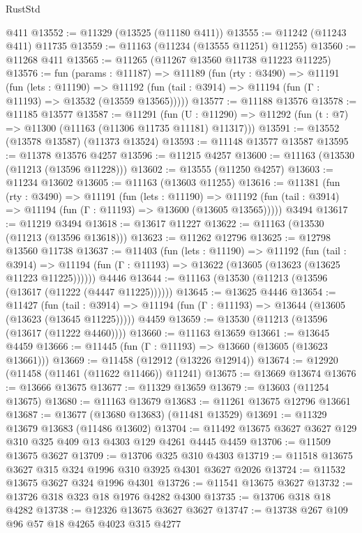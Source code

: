 \begin{lexlean}{RustStd}
\begin{coremodule}
    @411
@13552 := @11329 (@13525 (@11180 @411))
@13555 := @11242 (@11243 @411) @11735
@13559 := @11163 (@11234 (@13555 @11251) @11255)
@13560 := @11268 @411
@13565 := @11265 (@11267 @13560 @11738 @11223 @11225)
@13576 := fun (params : @11187) =>
  @11189
    (fun (rty : @3490) =>
    @11191
      (fun (lets : @11190) =>
      @11192 (fun (tail : @3914) => @11194 (fun (Γ : @11193) => @13532 (@13559 @13565)))))
@13577 := @11188 @13576
@13578 := @11185 @13577
@13587 := @11291
    (fun (U : @11290) => @11292 (fun (t : @7) => @11300 (@11163 (@11306 @11735 @11181) @11317)))
@13591 := @13552 (@13578 @13587) (@11373 @13524)
@13593 := @11148 @13577 @13587
@13595 := @11378 @13576 @4257
@13596 := @11215 @4257
@13600 := @11163 (@13530 (@11213 (@13596 @11228)))
@13602 := @13555 (@11250 @4257)
@13603 := @11234 @13602
@13605 := @11163 (@13603 @11255)
@13616 := @11381
    (fun (rty : @3490) =>
    @11191
      (fun (lets : @11190) =>
      @11192 (fun (tail : @3914) => @11194 (fun (Γ : @11193) => @13600 (@13605 @13565)))))
    @3494
@13617 := @11219 @3494
@13618 := @13617 @11227
@13622 := @11163 (@13530 (@11213 (@13596 @13618)))
@13623 := @11262 @12796
@13625 := @12798 @13560 @11738
@13637 := @11403
    (fun (lets : @11190) =>
    @11192
      (fun (tail : @3914) =>
      @11194 (fun (Γ : @11193) => @13622 (@13605 (@13623 (@13625 @11223 @11225))))))
    @4446
@13644 := @11163 (@13530 (@11213 (@13596 (@13617 (@11222 (@4447 @11225))))))
@13645 := @13625 @4446
@13654 := @11427
    (fun (tail : @3914) => @11194 (fun (Γ : @11193) => @13644 (@13605 (@13623 (@13645 @11225)))))
    @4459
@13659 := @13530 (@11213 (@13596 (@13617 (@11222 @4460))))
@13660 := @11163 @13659
@13661 := @13645 @4459
@13666 := @11445 (fun (Γ : @11193) => @13660 (@13605 (@13623 @13661)))
@13669 := @11458 (@12912 (@13226 @12914))
@13674 := @12920 (@11458 (@11461 (@11622 @11466)) @11241)
@13675 := @13669 @13674
@13676 := @13666 @13675
@13677 := @11329 @13659
@13679 := @13603 (@11254 @13675)
@13680 := @11163 @13679
@13683 := @11261 @13675 @12796 @13661
@13687 := @13677 (@13680 @13683) (@11481 @13529)
@13691 := @11329 @13679 @13683 (@11486 @13602)
@13704 := @11492 @13675 @3627 @3627 @129 @310 @325 @409 @13 @4303 @129 @4261 @4445 @4459
@13706 := @11509 @13675 @3627
@13709 := @13706 @325 @310 @4303
@13719 := @11518 @13675 @3627 @315 @324 @1996 @310 @3925 @4301 @3627 @2026
@13724 := @11532 @13675 @3627 @324 @1996 @4301
@13726 := @11541 @13675 @3627
@13732 := @13726 @318 @323 @18 @1976 @4282 @4300
@13735 := @13706 @318 @18 @4282
@13738 := @12326 @13675 @3627 @3627
@13747 := @13738 @267 @109 @96 @57 @18 @4265 @4023 @315 @4277

\end{coremodule}
\end{lexlean}
